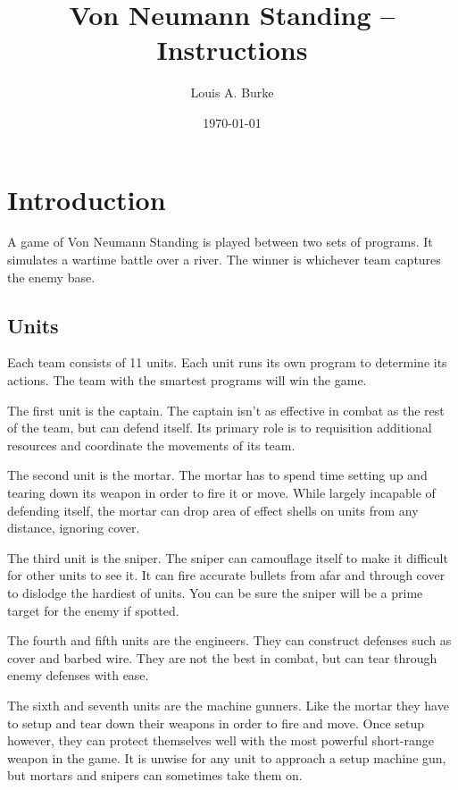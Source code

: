 \documentclass{article}
\title{Von Neumann Standing -- Instructions}
\date{\today}
\author{Louis A. Burke}
\begin{document}
\maketitle
\clearpage
\renewcommand{\baselinestretch}{0.9}\normalsize
\tableofcontents
\renewcommand{\baselinestretch}{1.0}\normalsize
\clearpage
\listoftables
\clearpage

\section{Introduction}

A game of Von Neumann Standing is played between two sets of programs. It
simulates a wartime battle over a river. The winner is whichever team captures
the enemy base.

\subsection{Units}

Each team consists of 11 units. Each unit runs its own program to determine its
actions. The team with the smartest programs will win the game.

The first unit is the captain. The captain isn't as effective in combat as the
rest of the team, but can defend itself. Its primary role is to requisition
additional resources and coordinate the movements of its team.

The second unit is the mortar. The mortar has to spend time setting up and
tearing down its weapon in order to fire it or move. While largely incapable of
defending itself, the mortar can drop area of effect shells on units from any
distance, ignoring cover.

The third unit is the sniper. The sniper can camouflage itself to make it
difficult for other units to see it. It can fire accurate bullets from afar and
through cover to dislodge the hardiest of units. You can be sure the sniper will
be a prime target for the enemy if spotted.

The fourth and fifth units are the engineers. They can construct defenses such
as cover and barbed wire. They are not the best in combat, but can tear through
enemy defenses with ease.

The sixth and seventh units are the machine gunners. Like the mortar they have
to setup and tear down their weapons in order to fire and move. Once setup
however, they can protect themselves well with the most powerful short-range
weapon in the game. It is unwise for any unit to approach a setup machine gun,
but mortars and snipers can sometimes take them on.
\end{document}
